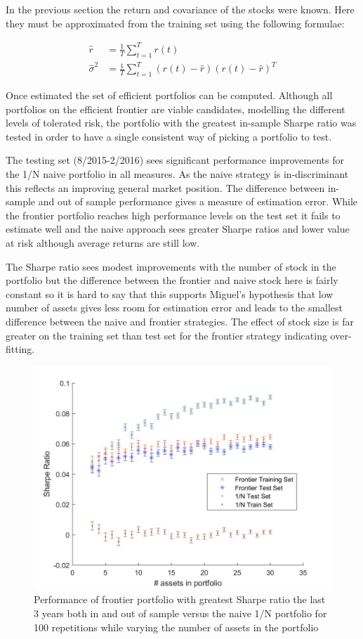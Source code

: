 \documentclass[a4paper,10pt, twocolumn]{article}
\begin{document}
In the previous section the return and covariance of the stocks were known. Here they must be approximated from the training set using the following formulae:

\begin{align}
\hat{r} &= \frac{1}{T}\sum^T_{t=1}r(t) \\
\hat{\sigma}^2 &= \frac{1}{T}\sum^T_{t=1}(r(t)-\hat{r})(r(t)-\hat{r})^T
\label{eq:}
\end{align}

Once estimated the set of efficient portfolios can be computed. Although all portfolios on the efficient frontier are viable candidates, modelling the different levels of tolerated risk, the portfolio with the greatest in-sample Sharpe ratio was tested in order to have a single consistent way of picking a portfolio to test. 

The testing set (8/2015-2/2016) sees significant performance improvements for the 1/N naive portfolio in all measures. As the naive strategy is in-discriminant this reflects an improving general market position. The difference between in-sample and out of sample performance gives a measure of estimation error. While the frontier portfolio reaches high performance levels on the test set it fails to estimate well and the naive approach sees greater Sharpe ratios and lower value at risk although average returns are still low. 

The Sharpe ratio sees modest improvements with the number of stock in the portfolio but the difference between the frontier and naive stock here is fairly constant so it is hard to say that this supports Miguel's hypothesis that low number of assets gives less room for estimation error and leads to the smallest difference between the naive and frontier strategies. The effect of stock size is far greater on the training set than test set for the frontier strategy indicating over-fitting. 


\begin{figure}[ht]
	\includegraphics[width=\linewidth]{Sharpe.jpg}
	\centering
	\caption{{Performance of frontier portfolio with greatest Sharpe ratio the last 3 years both in and out of sample versus the naive 1/N portfolio for 100 repetitions while varying the number of assets in the portfolio}}
			\label{fig:Performance_WA}
\end{figure}
\end{document}
